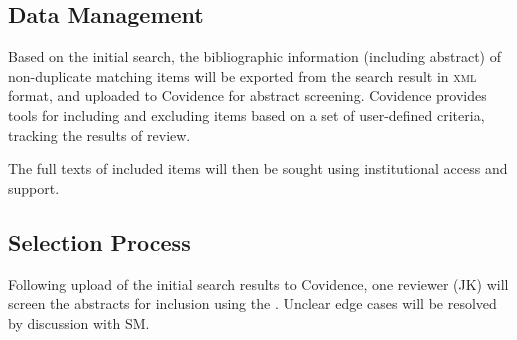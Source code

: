 \documentclass{article}
\begin{document}
\subsection{Data Management}
Based on the initial search,
the bibliographic information (including abstract)
of non-duplicate matching items will be
exported from the search result in \textsc{xml} format,
and uploaded to Covidence for abstract screening.
Covidence provides tools for including and excluding items
based on a set of user-defined criteria,
tracking the results of review.
\par
The full texts of included items will then be sought
using institutional access and support.
\subsection{Selection Process}
Following upload of the initial search results to Covidence,
one reviewer (JK) will screen the abstracts for inclusion
using the .
Unclear edge cases will be resolved by discussion with SM.
\end{document}
